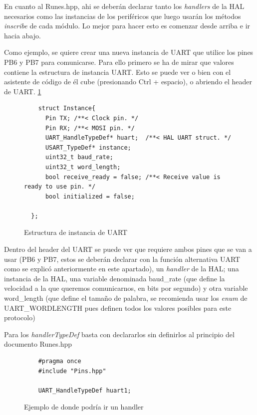 \documentclass{report}
\begin{document}
\par \vspace{0.3cm}
En cuanto al Runes.hpp, ahi se deberán declarar tanto los \textit{handlers} de la HAL necesarios como las instancias de los periféricos que luego usarán los métodos \textit{inscribe} de cada módulo. Lo mejor para hacer esto es comenzar desde arriba e ir hacia abajo. \par \vspace{0.3cm}
Como ejemplo, se quiere crear una nueva instancia de UART que utilice los pines PB6 y PB7 para comunicarse. Para ello primero se ha de mirar que valores contiene la estructura de instancia UART. Esto se puede ver o bien con el asistente de código de él cube (presionando Ctrl + espacio), o abriendo el header de UART. \ref{UARTinstancestruct}
\begin{figure}[H]
  \begin{lstlisting}
    struct Instance{
      Pin TX; /**< Clock pin. */
      Pin RX; /**< MOSI pin. */
      UART_HandleTypeDef* huart;  /**< HAL UART struct. */
      USART_TypeDef* instance;
      uint32_t baud_rate;
      uint32_t word_length;
      bool receive_ready = false; /**< Receive value is ready to use pin. */
      bool initialized = false;

  };
  \end{lstlisting}
  \caption{Estructura de instancia de UART}
    \label{UARTinstancestruct}
  \end{figure}
  \par \vspace{0.3cm}
Dentro del header del UART se puede ver que requiere ambos pines que se van a usar (PB6 y PB7, estos se deberán declarar con la función alternativa UART como se explicó anteriormente en este apartado), un \textit{handler} de la HAL; una instancia de la HAL, una variable denominada baud\_rate (que define la velocidad a la que queremos comunicarnos, en bits por segundo) y otra variable word\_length (que define el tamaño de palabra, se recomienda usar los \textit{enum} de UART\_WORDLENGTH pues definen todos los valores posibles para este protocolo) \par \vspace{0.3cm}
Para los \textit{handlerTypeDef} basta con declararlos sin definirlos al principio del documento Runes.hpp 

\begin{figure}[h]
  \begin{lstlisting}
    #pragma once
    #include "Pins.hpp"

    UART_HandleTypeDef huart1;
  \end{lstlisting}
  \caption{Ejemplo de donde podría ir un handler}
    \label{UARThandlerdeclaration}
  \end{figure}
  \par \vspace{0.3cm}
  
\end{document}
